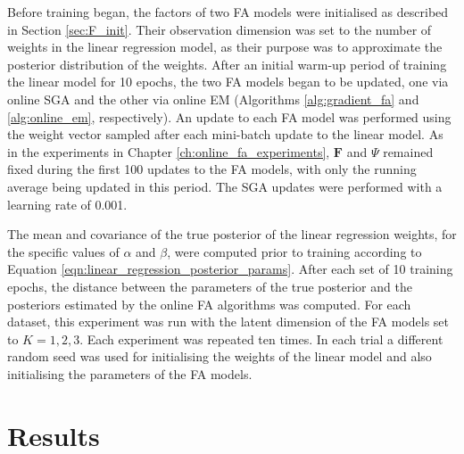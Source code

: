 \documentclass[msc,deptreport.inf]{infthesis} %
\newcommand{\matr}[1]{\mathbf{#1}}
\begin{document}
Before training began, the factors of two FA models were initialised as described in Section \ref{sec:F_init}. Their observation dimension was set to the number of weights in the linear regression model, as their purpose was to approximate the posterior distribution of the weights. After an initial warm-up period of training the linear model for 10 epochs, the two FA models began to be updated, one via online SGA and the other via online EM (Algorithms \ref{alg:gradient_fa} and \ref{alg:online_em}, respectively). An update to each FA model was performed using the weight vector sampled after each mini-batch update to the linear model. As in the experiments in Chapter \ref{ch:online_fa_experiments}, $\matr{F}$ and $\Psi$ remained fixed during the first 100 updates to the FA models, with only the running average being updated in this period. The SGA updates were performed with a learning rate of 0.001. 

The mean and covariance of the true posterior of the linear regression weights, for the specific values of $\alpha$ and $\beta$, were computed prior to training according to Equation \ref{eqn:linear_regression_posterior_params}. After each set of 10 training epochs, the distance between the parameters of the true posterior and the posteriors estimated by the online FA algorithms was computed. For each dataset, this experiment was run with the latent dimension of the FA models set to $K=1, 2, 3$. Each experiment was repeated ten times. In each trial a different random seed was used for initialising the weights of the linear model and also initialising the parameters of the FA models.

\section{Results}
\end{document}
